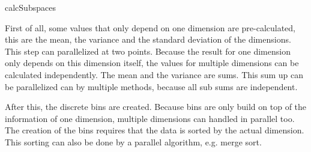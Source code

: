\begin{algorithm}


	\caption{calcSubspaces}
	\label{alg:calcSubspaces}
\end{algorithm}

First of all, some values that only depend on one dimension are pre-calculated, this are the mean, the variance and the standard deviation of the dimensions. This step can parallelized at two points. Because the result for one dimension only depends on this dimension itself, the values for multiple dimensions can be calculated independently. The mean and the variance are sums. This sum up can be parallelized can by multiple methods, because all sub sums are independent.

After this, the discrete bins are created. Because bins are only build on top of the information of one dimension, multiple dimensions can handled in parallel too. The creation of the bins requires that the data is sorted by the actual dimension. This sorting can also be done by a parallel algorithm, e.g. merge sort.

